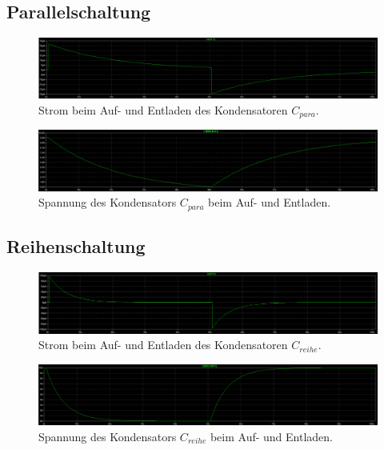 \documentclass[10pt,a4paper]{article}
\begin{document}
\subsection{Parallelschaltung}
\begin{flushleft}
\begin{figure}[H]
\centering
\includegraphics[scale=0.3]{I_C_para}
\caption{Strom beim Auf- und Entladen des Kondensatoren $C_{para}$.}
\end{figure}

\begin{figure}[H]
\centering
\includegraphics[scale=0.3]{V_C_para}
\caption{Spannung des Kondensators $C_{para}$ beim Auf- und Entladen.}
\end{figure}
\end{flushleft}

\subsection{Reihenschaltung}
\begin{flushleft}
\begin{figure}[H]
\centering
\includegraphics[scale=0.3]{I_C_reihe}
\caption{Strom beim Auf- und Entladen des Kondensatoren $C_{reihe}$.}
\end{figure}

\begin{figure}[H]
\centering
\includegraphics[scale=0.3]{V_C_reihe}
\caption{Spannung des Kondensators $C_{reihe}$ beim Auf- und Entladen.}
\end{figure}
\end{flushleft}
\end{document}
